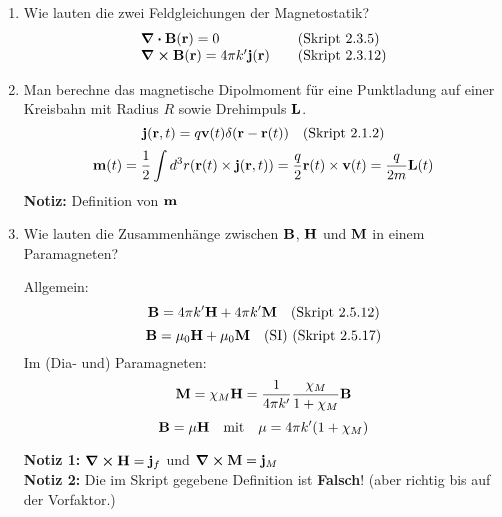 \begin{enumerate}
  \item Wie lauten die zwei Feldgleichungen der Magnetostatik?
    \begin{equation*}
      \begin{array}{ll}
        \div \vb B(\vb r) = 0&\quad\text{(Skript 2.3.5)}\\
        \curl \vb B(\vb r)= 4\pi k'\vb j(\vb r)&\quad\text{(Skript 2.3.12)}
      \end{array}
    \end{equation*}

  \item Man berechne das magnetische Dipolmoment für eine Punktladung auf
        einer Kreisbahn mit Radius $R$ sowie Drehimpuls $\vb L$.
        $$\vb j(\vb r,t)=q\vb v(t)\delta(\vb r-\vb r(t))\quad\text{(Skript 2.1.2)}$$
        $$\vb m(t) 
        = \frac{1}{2}\int d^3 r (\vb r(t) \times \vb j(\vb r,t))
        =\frac{q}{2}\vb r(t)\times\vb v(t)=\frac{q}{2m}\vb L(t)$$
        \textbf{Notiz:} Definition von $\vb m$ 

  \item Wie lauten die Zusammenhänge zwischen $\vb B$, $\vb H$ 
        und $\vb M$ in einem Paramagneten?

        Allgemein:
        $$\vb B = 4\pi k'\vb H + 4\pi k'\vb M\quad\text{(Skript 2.5.12)}$$
        $$\vb B = \mu_0 \vb H + \mu_0 \vb M \quad\text{(SI) 
        (Skript 2.5.17)}$$
        Im (Dia- und) Paramagneten:
        \begin{equation*}
            \vb M 
            = \chi_M \vb H 
            = \frac{1}{4\pi k'}\frac{\chi_M}{1+\chi_M} \vb B
        \end{equation*}
         \begin{equation*}
            \vb B = \mu \vb H \quad \text{mit}\quad
            \mu = 4\pi k'(1+\chi_M)
         \end{equation*}
          \begin{center}
          \end{center}

        \textbf{Notiz 1:} $\displaystyle \curl \vb H = \vb j_f$ und 
        $\displaystyle \curl \vb M=\vb j_M$\\
        \textbf{Notiz 2:} Die im Skript gegebene Definition ist 
        \textbf{Falsch}! (aber richtig bis auf der Vorfaktor.)
\end{enumerate}
